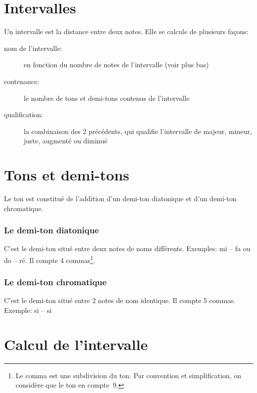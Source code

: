 \documentclass[11pt,a4paper]{scrreprt}
\begin{document}
\section{Intervalles}
Un intervalle est la distance entre deux notes. Elle se calcule de plusieurs façons:
\begin{description}
\item[nom de l'intervalle:] en fonction du nombre de notes de l'intervalle (voir plus bas) 
\item[contenance:] le nombre de tons et demi-tons contenus de l'intervalle
\item[qualification:] la combinaison des 2 précédents, qui qualifie l'intervalle de majeur, mineur, juste, augmenté ou diminué
\end{description}

\section{Tons et demi-tons}
Le ton est constitué de l'addition d'un demi-ton diatonique et d'un demi-ton chromatique.
\subsubsection{Le demi-ton diatonique}
C'est le demi-ton situé entre deux notes de noms différents. Exemples: mi -- fa ou do \fetasharp{} -- ré. Il compte 4 commas\footnote{Le comma est une subdivision du ton. Par convention et simplification, on considère que le ton en compte~9.}.
\subsubsection{Le demi-ton chromatique}
C'est le demi-ton situé entre 2 notes de nom identique. Il compte 5 commas. Exemple: si -- si \fetaflat

\section{Calcul de l'intervalle}
\end{document}
